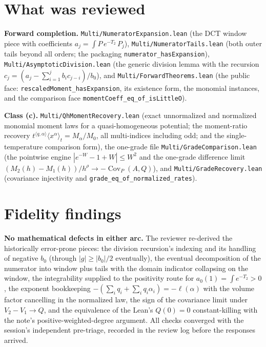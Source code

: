 \documentclass[11pt]{article}
\newcommand{\Cov}{\operatorname{Cov}}
\begin{document}
\section{What was reviewed}

\textbf{Forward completion.} \texttt{Multi/NumeratorExpansion.lean}
(the DCT window piece with coefficients $a_j = \int P\, e^{-T_2}\,
P_j$), \texttt{Multi/NumeratorTails.lean} (both outer tails beyond all
orders; the packaging \texttt{numerator\_hasExpansion}),
\texttt{Multi/AsymptoticDivision.lean} (the generic division lemma with
the recursion $c_j = (a_j - \sum_{i=1}^{j} b_i c_{j-i})/b_0$), and
\texttt{Multi/ForwardTheorems.lean} (the public face:
\texttt{rescaledMoment\_hasExpansion}, its existence form, the monomial
instances, and the comparison face
\texttt{momentCoeff\_eq\_of\_isLittleO}).

\textbf{Class (c).} \texttt{Multi/QhMomentRecovery.lean} (exact
unnormalized and normalized monomial moment laws for a
quasi-homogeneous potential; the moment-ratio recovery
$t^{\langle q,\alpha\rangle}\langle x^\alpha\rangle_t = M_\alpha/M_0$,
all multi-indices including odd; and the single-temperature
comparison form), the one-grade file
\texttt{Multi/GradeComparison.lean} (the pointwise engine
$|e^{-W}-1+W| \leq W^2$ and the one-grade difference limit
$(M_2(h)-M_1(h))/h^\rho \to -\Cov_P(A,Q)$), and
\texttt{Multi/GradeRecovery.lean} (covariance injectivity and
\texttt{grade\_eq\_of\_normalized\_rates}).

\section{Fidelity findings}

\textbf{No mathematical defects in either arc.} The reviewer
re-derived the historically error-prone pieces: the division
recursion's indexing and its handling of negative $b_0$ (through
$|g| \geq |b_0|/2$ eventually), the eventual decomposition of the
numerator into window plus tails with the domain indicator collapsing
on the window, the integrability supplied to the positivity route for
$a_0(1) = \int e^{-T_2} > 0$, the exponent bookkeeping
$-(\sum_i q_i + \sum_i q_i\alpha_i) = -\ell(\alpha)$ with the volume
factor cancelling in the normalized law, the sign of the covariance
limit under $V_2 - V_1 \to Q$, and the equivalence of the Lean's
$Q(0) = 0$ constant-killing with the note's positive-weighted-degree
argument. All checks converged with the session's independent
pre-triage, recorded in the review log before the responses arrived.
\end{document}
